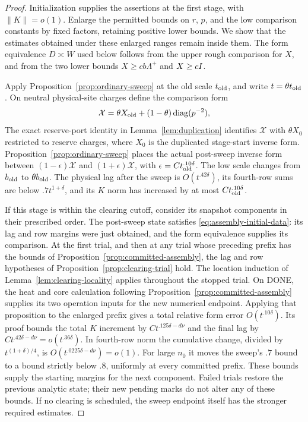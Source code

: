 \begin{proof}
Initialization supplies the assertions at the first stage, with
$\|K\|=o(1)$. Enlarge the permitted bounds on $r$, $p$, and the low
comparison constants by fixed factors, retaining positive lower bounds.
We show that the estimates obtained under these enlarged ranges remain
inside them. The form equivalence $D\asymp W$ used below follows from
the upper rough comparison for $X$, and from the two lower bounds
$X\ge cb\Lambda^+$ and $X\ge cI$.

Apply Proposition~\ref{prop:ordinary-sweep} at the old scale $t_{\rm old}$,
and write $t=\theta t_{\rm old}$. On neutral physical-site charges define
the comparison form
\begin{equation}
 \mathcal X=\theta X_{\rm old}
  +(1-\theta)\operatorname{diag}(p^{-2}),
 \label{eq:assembly-affine-reset}
\end{equation}
The exact reserve-port identity in Lemma~\ref{lem:duplication}
identifies $\mathcal X$ with $\theta X_0$ restricted to reserve
charges, where $X_0$ is the duplicated stage-start inverse form.
Proposition~\ref{prop:ordinary-sweep} places the actual post-sweep
inverse form between $(1-\epsilon)\mathcal X$ and
$(1+\epsilon)\mathcal X$, with $\epsilon=Ct_{\rm old}^{.10\delta}$.
The low scale changes from $b_{\rm old}$ to $\theta b_{\rm old}$.
The physical lag after the sweep is $O(t^{.42\delta})$, its fourth-row
sums are below $.7t^{1+\delta}$, and its $K$ norm has increased by at
most $Ct_{\rm old}^{.10\delta}$.

If this stage is within the clearing cutoff, consider its snapshot
components in their prescribed order. The post-sweep state satisfies
\eqref{eq:assembly-initial-data}: its lag and row margins were just
obtained, and the form equivalence supplies its comparison. At the first
trial, and then at any trial whose preceding prefix has the bounds of
Proposition~\ref{prop:committed-assembly}, the lag and row hypotheses of
Proposition~\ref{prop:clearing-trial} hold. The location induction of
Lemma~\ref{lem:clearing-locality} applies throughout the stopped trial.
On DONE, the heat and core calculation following
Proposition~\ref{prop:committed-assembly} supplies its two operation inputs
for the new numerical endpoint. Applying that proposition to the enlarged
prefix gives a total relative form error $O(t^{.10\delta})$.
Its proof bounds the total $K$ increment by
$Ct^{.125\delta-d\nu}$ and the final lag by
$Ct^{.42\delta-d\nu}=o(t^{.36\delta})$.
In fourth-row norm the cumulative change, divided by
$t^{(1+\delta)/4}$, is $O(t^{.0225\delta-d\nu})=o(1)$.
For large $n_0$ it moves the sweep's $.7$ bound to a bound strictly
below $.8$, uniformly at every committed prefix.
These bounds supply the starting margins for the next component.
Failed trials restore the previous analytic state; their new pending
marks do not alter any of these bounds. If no clearing is scheduled,
the sweep endpoint itself has the stronger required estimates.


\end{proof}
